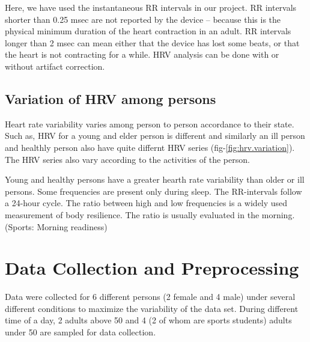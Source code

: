 \documentclass[a4paper, 11pt]{report}\usepackage[]{graphicx}\usepackage[]{color}
\numberwithin{figure}{section}
\begin{document}

Here, we have used the instantaneous RR intervals in our project. RR intervals shorter than 0.25 msec are not reported by the device – because this is the physical minimum duration of the heart contraction in an adult. RR intervals longer than 2 msec can mean either that the device has lost some beats, or that the heart is not contracting for a while.
HRV analysis can be done with or without artifact correction.

\section{Variation of HRV among persons}
Heart rate variability varies among person to person accordance to their state. Such as, HRV for a young and elder person is different and similarly an ill person and healthly person also have quite differnt HRV series (fig-\ref{fig:hrv.variation}). The HRV series also vary according to the activities of the person.

Young and healthy persons have a greater hearth rate variability than older or ill persons. Some frequencies are present only during sleep. The RR-intervals follow a 24-hour cycle. The ratio between high and low frequencies is a widely used measurement of body resilience. The ratio is usually evaluated in the morning. (Sports: Morning readiness)

\chapter{Data Collection and Preprocessing}
Data were collected for 6 different persons (2 female and 4 male) under several different conditions to maximize the variability of the data set. During different time of a day, 2 adults above 50 and 4 (2 of whom are sports students) adults under 50 are sampled for data collection.
\end{document}
